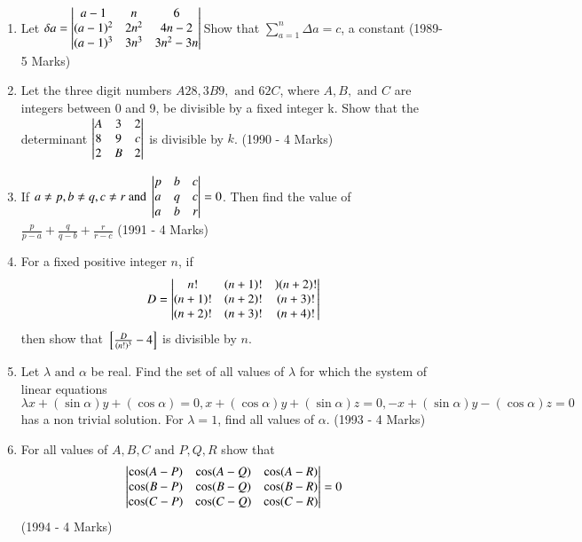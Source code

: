 \documentclass[journal,12pt,twocolumn]{IEEEtran}
\theoremstyle{remark}
\begin{document}
\begin{enumerate}
\item Let $\delta a=\begin{vmatrix}a-1&n&6\\(a-1)^2&2n^2&4n-2\\(a-1)^3&3n^3&3n^2-3n\end{vmatrix}\\$Show that $\displaystyle\sum_{a=1}^{n}\Delta a=c$, a constant \hfill (1989-5 Marks)\\[2pt]

\item Let the three digit numbers $A28, 3B9,\text{ and }62C$, where $A, B, \text{ and }C$ are integers between 0 and 9, be divisible by a fixed integer k. Show that the determinant $\begin{vmatrix}A&3&2\\8&9&c\\2&B&2\end{vmatrix}$ is divisible by $k$. \hfill (1990 - 4 Marks)\\[2pt]

\item If $a\neq p, b\neq q, c\neq r\text{ and }\begin{vmatrix}p&b&c\\a&q&c\\a&b&r\end{vmatrix}=0$. Then find the value of $\frac{p}{p-a}+\frac{q}{q-b}+\frac{r}{r-c}$ \hfill (1991 - 4 Marks)\\[2pt]

\item For a fixed positive integer $n$, if $$D=\begin{vmatrix}n!&(n+1)!&)(n+2)!\\(n+1)!&(n+2)!&(n+3)!\\(n+2)!&(n+3)!&(n+4)!\end{vmatrix}$$ then show that ${}\left[\frac{D}{(n!)^3}-4\right]$ is divisible by $n$.\\[2pt]

\item Let $\lambda\text{ and }\alpha$ be real. Find the set of all values of $\lambda$ for which the system of linear equations $$\lambda x+(\sin\alpha)y+(\cos\alpha)=0, x+(\cos\alpha)y+(\sin\alpha)z=0,-x+(\sin\alpha)y-(\cos\alpha)z=0$$ has a non trivial solution. For $\lambda = 1$, find all values of $\alpha$. \hfill (1993 - 4 Marks)\\[2pt]

\item For all values of $A,B,C\text{ and }P,Q,R$ show that $$\begin{vmatrix}\cos(A-P)&\cos(A-Q)&\cos(A-R)\\\cos(B-P)&\cos(B-Q)&\cos(B-R)\\\cos(C-P)&\cos(C-Q)&\cos(C-R)\end{vmatrix}=0$$ \hfill (1994 - 4 Marks)\\[2pt]
\end{enumerate}
\end{document}
